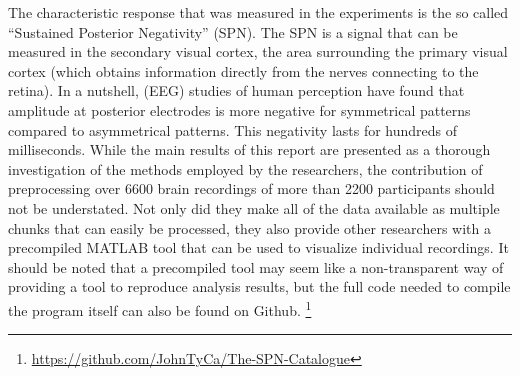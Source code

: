 \documentclass{article}
\begin{document}
The characteristic response that was measured in the experiments is the so called ``Sustained Posterior Negativity'' (SPN). The SPN is a signal that can be measured in the secondary visual cortex, the area surrounding the primary visual cortex (which obtains information directly from the nerves connecting to the retina). In a nutshell, (EEG) studies of human perception have found that amplitude at posterior electrodes is more negative for symmetrical patterns compared to asymmetrical patterns. This negativity lasts for hundreds of milliseconds. \cite{natureSPN}
While the main results of this report are presented as a thorough investigation of the methods employed by the researchers, the contribution of preprocessing over 6600 brain recordings of more than 2200 participants should not be understated. Not only did they make all of the data available as multiple chunks that can easily be processed, they also provide other researchers with a precompiled MATLAB tool that can be used to visualize individual recordings. It should be noted that a precompiled tool may seem like a non-transparent way of providing a tool to reproduce analysis results, but the full code needed to compile the program itself can also be found on Github. \footnote{\url{https://github.com/JohnTyCa/The-SPN-Catalogue}}
\end{document}
